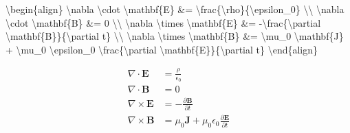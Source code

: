 \documentclass[
  letterpaper,
  DIV=11,
  numbers=noendperiod]{scrartcl}
\newenvironment{Shaded}{\begin{snugshade}}{\end{snugshade}}
\newcommand{\ExtensionTok}[1]{\textcolor[rgb]{0.00,0.23,0.31}{#1}}
\newcommand{\KeywordTok}[1]{\textcolor[rgb]{0.00,0.23,0.31}{#1}}
\newcommand{\NormalTok}[1]{\textcolor[rgb]{0.00,0.23,0.31}{#1}}
\newcommand{\SpecialCharTok}[1]{\textcolor[rgb]{0.37,0.37,0.37}{#1}}
\newcommand{\SpecialStringTok}[1]{\textcolor[rgb]{0.13,0.47,0.30}{#1}}
\begin{document}
\begin{Shaded}
\begin{Highlighting}[]
\SpecialStringTok{$$}\KeywordTok{\textbackslash{}begin}\NormalTok{\{}\ExtensionTok{align}\NormalTok{\}}
\SpecialCharTok{\textbackslash{}nabla}\SpecialStringTok{ }\SpecialCharTok{\textbackslash{}cdot}\SpecialStringTok{ }\SpecialCharTok{\textbackslash{}mathbf}\SpecialStringTok{\{E\} \&= }\SpecialCharTok{\textbackslash{}frac}\SpecialStringTok{\{}\SpecialCharTok{\textbackslash{}rho}\SpecialStringTok{\}\{}\SpecialCharTok{\textbackslash{}epsilon}\SpecialStringTok{\_0\} }\SpecialCharTok{\textbackslash{}\textbackslash{}}
\SpecialCharTok{\textbackslash{}nabla}\SpecialStringTok{ }\SpecialCharTok{\textbackslash{}cdot}\SpecialStringTok{ }\SpecialCharTok{\textbackslash{}mathbf}\SpecialStringTok{\{B\} \&= 0 }\SpecialCharTok{\textbackslash{}\textbackslash{}}
\SpecialCharTok{\textbackslash{}nabla}\SpecialStringTok{ }\SpecialCharTok{\textbackslash{}times}\SpecialStringTok{ }\SpecialCharTok{\textbackslash{}mathbf}\SpecialStringTok{\{E\} \&= {-}}\SpecialCharTok{\textbackslash{}frac}\SpecialStringTok{\{}\SpecialCharTok{\textbackslash{}partial}\SpecialStringTok{ }\SpecialCharTok{\textbackslash{}mathbf}\SpecialStringTok{\{B\}\}\{}\SpecialCharTok{\textbackslash{}partial}\SpecialStringTok{ t\} }\SpecialCharTok{\textbackslash{}\textbackslash{}}
\SpecialCharTok{\textbackslash{}nabla}\SpecialStringTok{ }\SpecialCharTok{\textbackslash{}times}\SpecialStringTok{ }\SpecialCharTok{\textbackslash{}mathbf}\SpecialStringTok{\{B\} \&= }\SpecialCharTok{\textbackslash{}mu}\SpecialStringTok{\_0 }\SpecialCharTok{\textbackslash{}mathbf}\SpecialStringTok{\{J\} + }\SpecialCharTok{\textbackslash{}mu}\SpecialStringTok{\_0 }\SpecialCharTok{\textbackslash{}epsilon}\SpecialStringTok{\_0 }\SpecialCharTok{\textbackslash{}frac}\SpecialStringTok{\{}\SpecialCharTok{\textbackslash{}partial}\SpecialStringTok{ }\SpecialCharTok{\textbackslash{}mathbf}\SpecialStringTok{\{E\}\}\{}\SpecialCharTok{\textbackslash{}partial}\SpecialStringTok{ t\}}
\KeywordTok{\textbackslash{}end}\NormalTok{\{}\ExtensionTok{align}\NormalTok{\}}\SpecialStringTok{$$}
\end{Highlighting}
\end{Shaded}

\[\begin{align}
\nabla \cdot \mathbf{E} &= \frac{\rho}{\epsilon_0} \\
\nabla \cdot \mathbf{B} &= 0 \\
\nabla \times \mathbf{E} &= -\frac{\partial \mathbf{B}}{\partial t} \\
\nabla \times \mathbf{B} &= \mu_0 \mathbf{J} + \mu_0 \epsilon_0 \frac{\partial \mathbf{E}}{\partial t}
\end{align}\]
\end{document}
